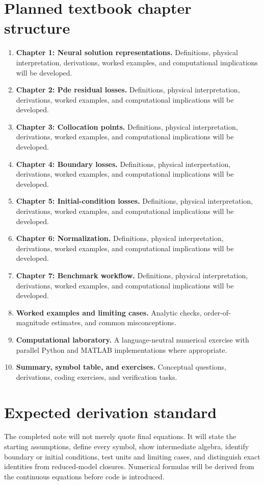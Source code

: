 \documentclass[11pt]{article}
\begin{document}
\section{Planned textbook chapter structure}
\begin{enumerate}[leftmargin=1.8em]
\item \textbf{Chapter 1: Neural solution representations.} Definitions, physical interpretation, derivations, worked examples, and computational implications will be developed.
\item \textbf{Chapter 2: Pde residual losses.} Definitions, physical interpretation, derivations, worked examples, and computational implications will be developed.
\item \textbf{Chapter 3: Collocation points.} Definitions, physical interpretation, derivations, worked examples, and computational implications will be developed.
\item \textbf{Chapter 4: Boundary losses.} Definitions, physical interpretation, derivations, worked examples, and computational implications will be developed.
\item \textbf{Chapter 5: Initial-condition losses.} Definitions, physical interpretation, derivations, worked examples, and computational implications will be developed.
\item \textbf{Chapter 6: Normalization.} Definitions, physical interpretation, derivations, worked examples, and computational implications will be developed.
\item \textbf{Chapter 7: Benchmark workflow.} Definitions, physical interpretation, derivations, worked examples, and computational implications will be developed.
\item \textbf{Worked examples and limiting cases.} Analytic checks, order-of-magnitude estimates, and common misconceptions.
\item \textbf{Computational laboratory.} A language-neutral numerical exercise with parallel Python and MATLAB implementations where appropriate.
\item \textbf{Summary, symbol table, and exercises.} Conceptual questions, derivations, coding exercises, and verification tasks.
\end{enumerate}

\section{Expected derivation standard}
The completed note will not merely quote final equations. It will state the starting assumptions, define every symbol, show intermediate algebra, identify boundary or initial conditions, test units and limiting cases, and distinguish exact identities from reduced-model closures. Numerical formulas will be derived from the continuous equations before code is introduced.
\end{document}
